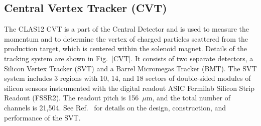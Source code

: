 \documentclass[final,3p,twocolumn]{elsarticle}
\begin{document}
\subsection{Central Vertex Tracker (CVT)}

The CLAS12 CVT is a part of the Central Detector and is used to measure the momentum and to determine the vertex
of charged particles scattered from the production target, which is centered within the solenoid magnet. Details of
the tracking system are shown in Fig.~\ref{CVT}. It consists of two separate detectors, a Silicon Vertex Tracker
(SVT) and a Barrel Micromegas Tracker  (BMT). The SVT system includes 3 regions with 10, 14, and 18 sectors of
double-sided modules of silicon sensors instrumented with the digital readout ASIC Fermilab Silicon Strip Readout (FSSR2). 
The readout pitch is
156~$\mu$m, and the total number of channels is 21,504. See Ref.~\cite{SVT} for details on the design,
construction, and performance of the SVT.
\end{document}
